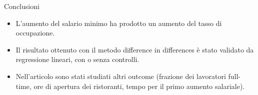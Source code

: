 \documentclass[
  ignorenonframetext,
]{beamer}
\providecommand{\tightlist}{%
  \setlength{\itemsep}{0pt}\setlength{\parskip}{0pt}}
\begin{document}
\begin{frame}{Conclusioni}
\protect\hypertarget{conclusioni}{}

\begin{itemize}
\tightlist
\item
  L'aumento del salario minimo ha prodotto un aumento del tasso di
  occupazione.
\item
  Il risultato ottenuto con il metodo difference in differences è stato
  validato da regressione lineari, con o senza controlli.
\item
  Nell'articolo sono stati studiati altri outcome (frazione dei
  lavoratori full-time, ore di apertura dei ristoranti, tempo per il
  primo aumento salariale).
\end{itemize}

\end{frame}
\end{document}
